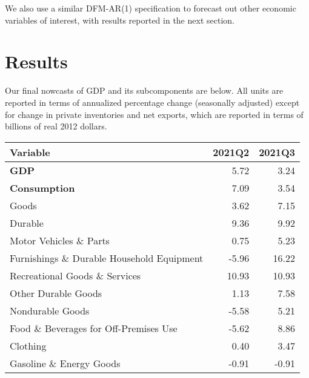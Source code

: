 \documentclass[11pt, letterpaper]{article}\usepackage[]{graphicx}\usepackage[]{color}
\begin{document}
We also use a similar DFM-AR(1) specification to forecast out other economic variables of interest, with results reported in the next section.


\section{Results}
Our final nowcasts of GDP and its subcomponents are below. All units are reported in terms of annualized percentage change (seasonally adjusted) except for change in private inventories and net exports, which are reported in terms of billions of real 2012 dollars.
\begin{table}[H]
\centering
\begingroup\fontsize{10pt}{12pt}\selectfont
\begin{tabular}{lrr}
  \hline
Variable & 2021Q2 & 2021Q3 \\ 
  \hline
\hspace{0mm} \textbf{GDP} & 5.72 & 3.24 \\ 
  \hspace{0mm} \textbf{Consumption} & 7.09 & 3.54 \\ 
  \hspace{8mm}  Goods & 3.62 & 7.15 \\ 
  \hspace{16mm}  Durable & 9.36 & 9.92 \\ 
  \hspace{24mm}  Motor Vehicles \& Parts & 0.75 & 5.23 \\ 
  \hspace{24mm}  Furnishings \& Durable Household Equipment & -5.96 & 16.22 \\ 
  \hspace{24mm}  Recreational Goods \& Services & 10.93 & 10.93 \\ 
  \hspace{24mm}  Other Durable Goods & 1.13 & 7.58 \\ 
  \hspace{16mm}  Nondurable Goods & -5.58 & 5.21 \\ 
  \hspace{24mm}  Food \& Beverages for Off-Premises Use & -5.62 & 8.86 \\ 
  \hspace{24mm}  Clothing & 0.40 & 3.47 \\ 
  \hspace{24mm}  Gasoline \& Energy Goods & -0.91 & -0.91 \\ 

\end{tabular}
\end{table}
\end{document}
